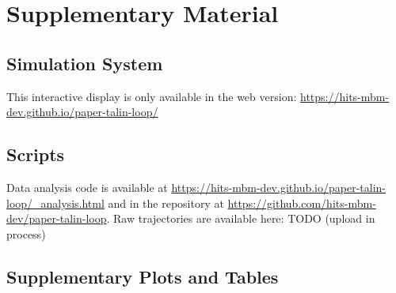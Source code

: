 \documentclass[
  twocolumn]{biophys-new-mod}
\begin{document}
\hypertarget{supplementary-material}{%
\section{Supplementary Material}\label{supplementary-material}}

\hypertarget{sec-system}{%
\subsection{Simulation System}\label{sec-system}}

\begin{tcolorbox}[enhanced jigsaw, coltitle=black, left=2mm, leftrule=.75mm, toprule=.15mm, opacityback=0, bottomtitle=1mm, colback=white, breakable, rightrule=.15mm, opacitybacktitle=0.6, arc=.35mm, colbacktitle=quarto-callout-note-color!10!white, bottomrule=.15mm, colframe=quarto-callout-note-color-frame, toptitle=1mm, titlerule=0mm, title=\textcolor{quarto-callout-note-color}{\faInfo}\hspace{0.5em}{Note}]
This interactive display is only available in the web version:
\url{https://hits-mbm-dev.github.io/paper-talin-loop/}
\end{tcolorbox}

\hypertarget{scripts}{%
\subsection{Scripts}\label{scripts}}

Data analysis code is available at
\url{https://hits-mbm-dev.github.io/paper-talin-loop/_analysis.html} and
in the repository at
\url{https://github.com/hits-mbm-dev/paper-talin-loop}. Raw trajectories
are available here: TODO (upload in process)

\hypertarget{supplementary-plots-and-tables}{%
\subsection{Supplementary Plots and
Tables}\label{supplementary-plots-and-tables}}
\end{document}
